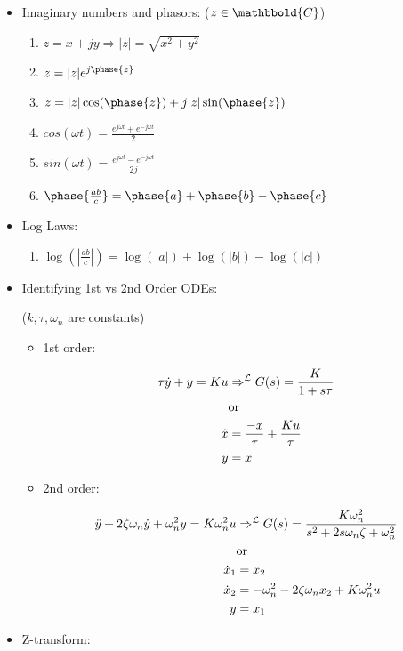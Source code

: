 \begin{itemize}
        \item Imaginary numbers and phasors: ($z \in \mathbbold{C}$)

            \begin{enumerate}
                \item $ z = x + jy \Rightarrow |z| = \sqrt{x^2 + y^2}$
                \item $ z = |z|e^{j\phase{z}} $
                \item $ z = |z| \cos(\phase{z}) + j|z|\sin(\phase{z}) $
                \item $cos(\omega t) = \frac{e^{j\omega t} + e^{-j\omega t}}{2} $
                \item $sin(\omega t) = \frac{e^{j\omega t} - e^{-j\omega t}}{2j} $
                \item $\phase{\frac{ab}{c}} = \phase{a} + \phase{b} - \phase{c}$
            \end{enumerate}

        \item Log Laws:

            \begin{enumerate}
                \item $\log(\left|\frac{ab}{c}\right|) = \log(|a|) + \log(|b|) - \log(|c|)$
            \end{enumerate}

        \item Identifying 1st vs 2nd Order ODEs:

            ($k, \tau, \omega_n$ are constants)

            \begin{itemize}
                \item 1st order:

                    \begin{align*}
                        \tau \dot{y} + y = Ku &\Rightarrow^{\mathcal{L}} G(s) = \frac{K}{1+s\tau} \\
                        &\text{or} \\
                        \dot{x} &= \frac{-x}{\tau} + \frac{Ku}{\tau} \\ y &= x
                    \end{align*}

                \item 2nd order:

                    \begin{align*}
                        \ddot{y} + 2\zeta \omega_n \dot{y} + \omega_n^2 y = K\omega_n^2u &\Rightarrow^{\mathcal{L}} G(s) = \frac{K \omega_n^2}{s^2 + 2s\omega_n \zeta + \omega_n^2} \\
                        &\text{or} \\
                        \dot{x}_1 &= x_2 \\ \dot{x}_2 &= -\omega_n^2 -2 \zeta \omega_n x_2 + K \omega_n^2 u \\ y &= x_1 \\
                    \end{align*}
            \end{itemize}
        \item Z-transform:


\end{itemize}
